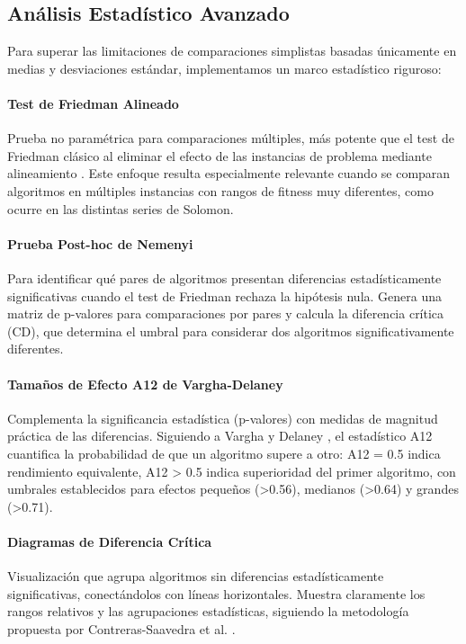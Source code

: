 \documentclass[conference,a4paper]{IEEEtran}
\begin{document}
\subsection{Análisis Estadístico Avanzado}

Para superar las limitaciones de comparaciones simplistas basadas únicamente en medias y desviaciones estándar, implementamos un marco estadístico riguroso:

\paragraph{Test de Friedman Alineado} Prueba no paramétrica para comparaciones múltiples, más potente que el test de Friedman clásico al eliminar el efecto de las instancias de problema mediante alineamiento \cite{Li2020SMA}. Este enfoque resulta especialmente relevante cuando se comparan algoritmos en múltiples instancias con rangos de fitness muy diferentes, como ocurre en las distintas series de Solomon.

\paragraph{Prueba Post-hoc de Nemenyi} Para identificar qué pares de algoritmos presentan diferencias estadísticamente significativas cuando el test de Friedman rechaza la hipótesis nula. Genera una matriz de p-valores para comparaciones por pares y calcula la diferencia crítica (CD), que determina el umbral para considerar dos algoritmos significativamente diferentes.

\paragraph{Tamaños de Efecto A12 de Vargha-Delaney} Complementa la significancia estadística (p-valores) con medidas de magnitud práctica de las diferencias. Siguiendo a Vargha y Delaney \cite{Vargha2000}, el estadístico A12 cuantifica la probabilidad de que un algoritmo supere a otro: A12 = 0.5 indica rendimiento equivalente, A12 > 0.5 indica superioridad del primer algoritmo, con umbrales establecidos para efectos pequeños (>0.56), medianos (>0.64) y grandes (>0.71).

\paragraph{Diagramas de Diferencia Crítica} Visualización que agrupa algoritmos sin diferencias estadísticamente significativas, conectándolos con líneas horizontales. Muestra claramente los rangos relativos y las agrupaciones estadísticas, siguiendo la metodología propuesta por Contreras-Saavedra et al. \cite{Contreras2024CD}.
\end{document}
